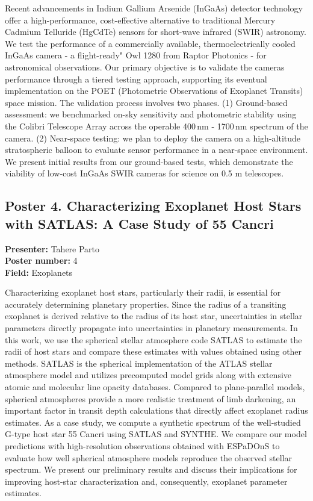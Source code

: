 Recent advancements in Indium Gallium Arsenide (InGaAs) detector technology offer a high-performance, cost-effective alternative to traditional Mercury Cadmium Telluride (HgCdTe) sensors for short-wave infrared (SWIR) astronomy. We test the performance of a commercially available, thermoelectrically cooled InGaAs camera - a flight-ready" Owl 1280 from Raptor Photonics - for astronomical observations. Our primary objective is to validate the cameras performance through a tiered testing approach, supporting its eventual implementation on the POET (Photometric Observations of Exoplanet Transits) space mission. The validation process involves two phases. (1) Ground-based assessment: we benchmarked on-sky sensitivity and photometric stability using the Colibri Telescope Array across the operable 400\,nm - 1700\,nm spectrum of the camera. (2) Near-space testing: we plan to deploy the camera on a high-altitude stratospheric balloon to evaluate sensor performance in a near-space environment. We present initial results from our ground-based tests, which demonstrate the viability of low-cost InGaAs SWIR cameras for science on 0.5 m telescopes.

\hypertarget{poster-abstract-talk-306}{}\label{poster-abstract-page-talk-306}
\subsection*{Poster 4. Characterizing Exoplanet Host Stars with SATLAS: A Case Study of 55 Cancri}
\textbf{Presenter:} Tahere Parto\\
\textbf{Poster number:} 4\\
\textbf{Field:} Exoplanets

Characterizing exoplanet host stars, particularly their radii, is essential for accurately determining planetary properties. Since the radius of a transiting exoplanet is derived relative to the radius of its host star, uncertainties in stellar parameters directly propagate into uncertainties in planetary measurements. In this work, we use the spherical stellar atmosphere code SATLAS to estimate the radii of host stars and compare these estimates with values obtained using other methods. SATLAS is the spherical implementation of the ATLAS stellar atmosphere model and utilizes precomputed model grids along with extensive atomic and molecular line opacity databases. Compared to plane-parallel models, spherical atmospheres provide a more realistic treatment of limb darkening, an important factor in transit depth calculations that directly affect exoplanet radius estimates. As a case study, we compute a synthetic spectrum of the well-studied G-type host star 55 Cancri using SATLAS and SYNTHE. We compare our model predictions with high-resolution observations obtained with ESPaDOnS to evaluate how well spherical atmosphere models reproduce the observed stellar spectrum. We present our preliminary results and discuss their implications for improving host-star characterization and, consequently, exoplanet parameter estimates.

